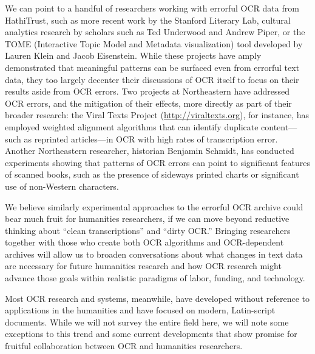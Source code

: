 \documentclass[twoside,11pt]{report}
\begin{document}
We can point to a handful of researchers working with errorful OCR data from HathiTrust, such as more recent work by the Stanford Literary Lab, cultural analytics research by scholars such as Ted Underwood and Andrew Piper, or the TOME (Interactive Topic Model and Metadata visualization) tool developed by Lauren Klein and Jacob Eisenstein. While these projects have amply demonstrated that meaningful patterns can be surfaced even from errorful text data, they too largely decenter their discussions of OCR itself to focus on their results aside from OCR errors. Two projects at Northeastern have addressed OCR errors, and the mitigation of their effects, more directly as part of their broader research: the Viral Texts Project (\url{http://viraltexts.org}), for instance, has employed weighted alignment algorithms that can identify duplicate content---such as reprinted articles---in OCR with high rates of transcription error. Another Northeastern researcher, historian Benjamin Schmidt, has conducted experiments showing that patterns of OCR errors can point to significant features of scanned books, such as the presence of sideways printed charts or significant use of non-Western characters.

We believe similarly experimental approaches to the errorful OCR archive could bear much fruit for humanities researchers, if we can move beyond reductive thinking about ``clean transcriptions'' and ``dirty OCR.'' Bringing researchers together with those who create both OCR algorithms and OCR-depen\-dent archives will allow us to broaden conversations about what changes in text data are necessary for future humanities research and how OCR research might advance those goals within realistic paradigms of labor, funding, and technology.

Most OCR research and systems, meanwhile, have developed without reference to applications in the humanities and have focused on modern, Latin-script documents. While we will not survey the entire field here, we will note some exceptions to this trend and some current developments that show promise for fruitful collaboration between OCR and humanities researchers.
\end{document}
